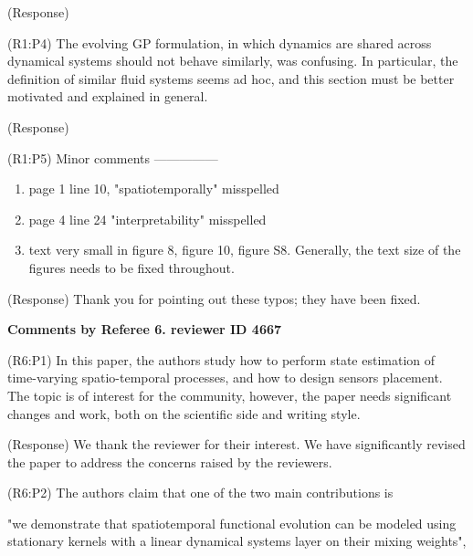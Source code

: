 \documentclass{letter}
\begin{document}
{\color{red}(Response)}

{\color{red}(R1:P4)} The evolving GP formulation, in which dynamics are shared across
dynamical systems should not behave similarly, was confusing. In
particular, the definition of similar fluid systems seems ad hoc, and
this section must be better motivated and explained in general. 

{\color{red}(Response)}


{\color{red}(R1:P5)} Minor comments
---------------
\begin{enumerate}
\item page 1 line 10, "spatiotemporally" misspelled
\item page 4 line 24 "interpretability" misspelled
\item text very small in figure 8, figure 10, figure S8. Generally, the
text size of the figures needs to be fixed throughout. 
\end{enumerate}

{\color{red}(Response)} Thank you for pointing out these typos; they have been fixed.



{\bf Comments by Referee 6. reviewer ID 4667}

{\color{red}(R6:P1)} In this paper, the authors study how to perform state estimation of
time-varying spatio-temporal processes, and how to design sensors
placement. 
The topic is of interest for the community, however, the
paper needs significant changes and work, both on the scientific side
and writing style. 

{\color{red}(Response)} We thank the reviewer for their interest. We have significantly revised the paper to address the concerns raised by the reviewers.

{\color{red}(R6:P2)} The authors claim that one of the two main contributions is 

"we demonstrate that spatiotemporal functional evolution can be modeled
using stationary kernels with a linear dynamical systems layer on their
mixing weights",
\end{document}
